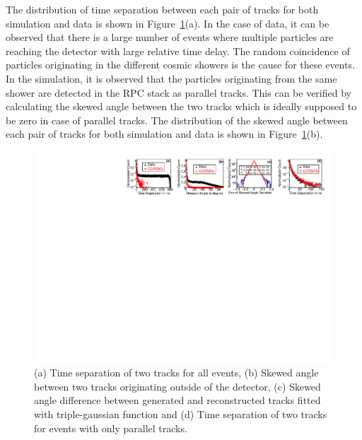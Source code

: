 \documentclass[a4paper,12pt,twoside,openany]{article}
\begin{document}
The distribution of time separation between each pair of tracks for both simulation and data is shown in Figure~\ref{fig:time_sep}(a). In the case of data, it can be observed that there is a large number of events where multiple particles are reaching the detector with large relative time delay. The random coincidence of particles originating in the different cosmic showers is the cause for these events. In the simulation, it is observed that the particles originating from the same shower are detected in the RPC stack as parallel tracks. This can be verified by calculating the skewed angle between the two tracks which is ideally supposed to be zero in case of parallel tracks. The distribution of the skewed angle between each pair of tracks for both simulation and data is shown in Figure~\ref{fig:time_sep}(b).
\begin{figure}[h]
  \includegraphics[width=1.0\linewidth]{time_skew_all.pdf} 
  \caption{(a) Time separation of two tracks for all events, (b) Skewed angle between two tracks originating outside of the detector, (c) Skewed angle difference between generated and reconstructed tracks fitted with triple-gaussian function and (d) Time separation of two tracks for events with only parallel tracks.}
  \label{fig:time_sep}
\end{figure}
\end{document}
